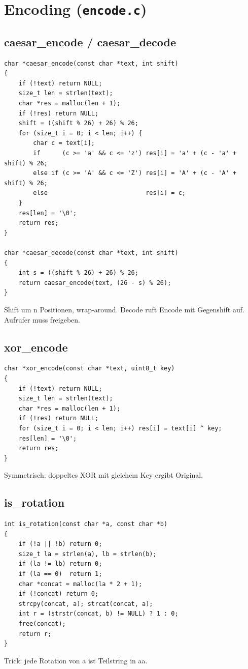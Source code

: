 \documentclass[10pt, a4paper]{article}
\begin{document}
\section{Encoding (\texttt{encode.c})}

\subsection{caesar\_encode / caesar\_decode}
\begin{lstlisting}
char *caesar_encode(const char *text, int shift)
{
    if (!text) return NULL;
    size_t len = strlen(text);
    char *res = malloc(len + 1);
    if (!res) return NULL;
    shift = ((shift % 26) + 26) % 26;
    for (size_t i = 0; i < len; i++) {
        char c = text[i];
        if      (c >= 'a' && c <= 'z') res[i] = 'a' + (c - 'a' + shift) % 26;
        else if (c >= 'A' && c <= 'Z') res[i] = 'A' + (c - 'A' + shift) % 26;
        else                           res[i] = c;
    }
    res[len] = '\0';
    return res;
}

char *caesar_decode(const char *text, int shift)
{
    int s = ((shift % 26) + 26) % 26;
    return caesar_encode(text, (26 - s) % 26);
}
\end{lstlisting}
Shift um n Positionen, wrap-around. Decode ruft Encode mit Gegenshift auf. Aufrufer muss freigeben.

\subsection{xor\_encode}
\begin{lstlisting}
char *xor_encode(const char *text, uint8_t key)
{
    if (!text) return NULL;
    size_t len = strlen(text);
    char *res = malloc(len + 1);
    if (!res) return NULL;
    for (size_t i = 0; i < len; i++) res[i] = text[i] ^ key;
    res[len] = '\0';
    return res;
}
\end{lstlisting}
Symmetrisch: doppeltes XOR mit gleichem Key ergibt Original.

\subsection{is\_rotation}
\begin{lstlisting}
int is_rotation(const char *a, const char *b)
{
    if (!a || !b) return 0;
    size_t la = strlen(a), lb = strlen(b);
    if (la != lb) return 0;
    if (la == 0)  return 1;
    char *concat = malloc(la * 2 + 1);
    if (!concat) return 0;
    strcpy(concat, a); strcat(concat, a);
    int r = (strstr(concat, b) != NULL) ? 1 : 0;
    free(concat);
    return r;
}
\end{lstlisting}
Trick: jede Rotation von a ist Teilstring in aa.
\end{document}
